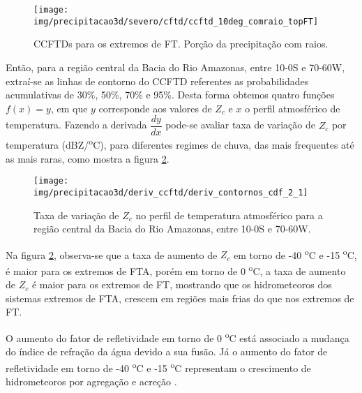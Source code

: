 \begin{figure}[!ht]
  \centering
  \texttt{[image: img/precipitacao3d/severo/cftd/ccftd\_10deg\_comraio\_topFT]}
  \caption{CCFTDs para os extremos de FT. Porção da precipitação com raios.}
  \label{ccftd_ft_com}   
\end{figure} 

Então, para a região central da Bacia do Rio Amazonas, entre 10-0S e 70-60W, extraí-se as linhas de contorno do CCFTD referentes as probabilidades acumulativas de 30\%, 50\%, 70\% e 95\%. Desta forma obtemos quatro funções $f(x)=y$,  em que $y$ corresponde aos valores de $Z_c$ e $x$ o perfil atmosférico de temperatura. Fazendo a derivada $\dfrac{dy}{dx}$ pode-se avaliar taxa de variação de $Z_c$ por temperatura (dBZ/\textsuperscript{o}C), para diferentes regimes de chuva, das mais frequentes até as mais raras, como mostra a figura \ref{deriv_amazonas}.

\begin{figure}[!ht]
  \centering
  \texttt{[image: img/precipitacao3d/deriv\_ccftd/deriv\_contornos\_cdf\_2\_1]}
  \caption{Taxa de variação de $Z_c$ no perfil de temperatura atmosférico para a região central da Bacia do Rio Amazonas, entre 10-0S e 70-60W.}
  \label{deriv_amazonas}  
\end{figure} 


Na figura \ref{deriv_amazonas}, observa-se que a taxa de aumento de $Z_c$ em torno de -40 \textsuperscript{o}C e -15 \textsuperscript{o}C, é maior para os extremos de FTA, porém em torno de 0 \textsuperscript{o}C, a taxa de aumento de $Z_c$ é maior para os extremos de FT, mostrando que os hidrometeoros dos sistemas extremos de FTA, crescem em regiões mais frias do que nos extremos de FT.


O aumento do fator de refletividade em torno de 0 \textsuperscript{o}C está associado a mudança do índice de refração da água devido a sua fusão. Já o aumento do fator de refletividade em torno de -40 \textsuperscript{o}C e -15 \textsuperscript{o}C representam o crescimento de hidrometeoros por agregação e acreção \cite{Fabry1995,Takahashi1978}.

